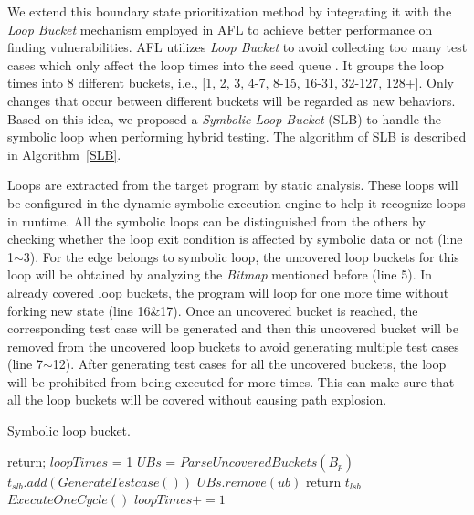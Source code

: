 We extend this boundary state prioritization method by integrating it 
with the \emph{Loop Bucket} mechanism employed in AFL \cite{online:afl} 
to achieve better performance on finding vulnerabilities.
AFL utilizes \emph{Loop Bucket} to avoid collecting too many test cases 
which only affect the loop times into the seed queue \cite{online:afl}. 
It groups the loop times into 8 different buckets, i.e., 
[1, 2, 3, 4-7, 8-15, 16-31, 32-127, 128+]. Only changes that occur 
between different buckets will be regarded as new behaviors. 
Based on this idea, we proposed a \textit{Symbolic Loop Bucket} (SLB) 
to handle the symbolic loop when performing hybrid testing. The 
algorithm of SLB is described in Algorithm~\ref{SLB}.

Loops are extracted from the target program by static analysis. 
These loops will be configured in the dynamic symbolic execution 
engine to help it recognize loops in runtime. All the symbolic loops 
can be distinguished from the others by checking whether the loop 
exit condition is affected by symbolic data or not (line 1$\sim$3). 
For the edge belongs to symbolic loop, the uncovered loop buckets 
for this loop will be obtained by analyzing the \textit{Bitmap} 
mentioned before (line 5). 
In already covered loop buckets, the program will loop for one more 
time without forking new state (line 16\&17). Once an uncovered bucket 
is reached, the corresponding test case will be generated and then 
this uncovered bucket will be removed from the uncovered loop buckets 
to avoid generating multiple test cases (line 7$\sim$12). After 
generating test cases for all the uncovered buckets, the loop will 
be prohibited from being executed for more times. This can make sure 
that all the loop buckets will be covered without causing path explosion.

\begin{algorithm}
  \LinesNumbered
  \caption{Symbolic loop bucket.}
  \label{SLB}
  {
    return;
  }
  $loopTimes$ = 1\;
  $UBs$ = $ParseUncoveredBuckets(B_p)$\;
  {
    {
      {
        $t_{slb}.add(GenerateTestcase())$\;
        $UBs$.$remove(ub)$\;
      }
    }
    {
      return $t_{lsb}$\;
    }{
      $ExecuteOneCycle()$\;
      $loopTimes += 1$\;
    }
  }
\end{algorithm}  

